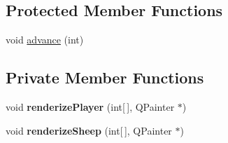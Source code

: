 \subsection*{Protected Member Functions}
\begin{DoxyCompactItemize}
\item 
void \hyperlink{classGraphicItem_afa2b9d2368564680b1cd7e24ce20de00}{advance} (int)
\end{DoxyCompactItemize}
\subsection*{Private Member Functions}
\begin{DoxyCompactItemize}
\item 
\hypertarget{classGraphicItem_aa23a3b7bab4dfdba32e3532ca1d2984b}{
void {\bfseries renderizePlayer} (int\mbox{[}$\,$\mbox{]}, QPainter $\ast$)}
\label{classGraphicItem_aa23a3b7bab4dfdba32e3532ca1d2984b}

\item 
\hypertarget{classGraphicItem_a7779518c39a092820956859eb42c4e9e}{
void {\bfseries renderizeSheep} (int\mbox{[}$\,$\mbox{]}, QPainter $\ast$)}
\label{classGraphicItem_a7779518c39a092820956859eb42c4e9e}

\end{DoxyCompactItemize}
